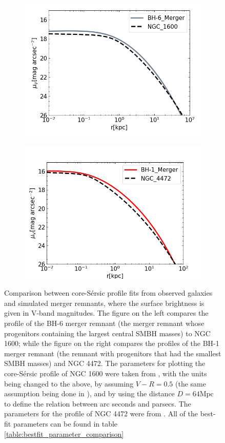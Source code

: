 \documentclass[english, oneside]{HYgradu}
\begin{document}
\begin{figure}
	\centering
	\begin{subfigure}[b]{0.49\textwidth}
		\includegraphics[width=\textwidth]{BH-6_NGC1600.png}
	\end{subfigure}
	\begin{subfigure}[b]{0.49\textwidth}
		\includegraphics[width=\textwidth]{BH-1_NGC4472.png}
	\end{subfigure}
	\caption{Comparison between core-Sérsic profile fits from observed galaxies and simulated merger remnants, where the surface brightness is given in V-band magnitudes. The figure on the left compares the profile of the BH-6 merger remnant (the merger remnant whose progenitors containing the largest central SMBH masses) to NGC 1600; while the figure on the right compares the profiles of the BH-1 merger remnant (the remnant with progenitors that had the smallest SMBH masses) and NGC 4472. The parameters for plotting the core-Sérsic profile of NGC 1600 were taken from \cite{Thomas2016}, with the units being changed to the above, by assuming $V - R = 0.5$ (the same assumption being done in \cite{Lauer2007}), and by using the distance $D = 64 \mathrm{Mpc}$ \citep{Thomas2016} to define the relation between arc seconds and parsecs. The parameters for the profile of NGC 4472 were from \cite{Rusli2013}. All of the best-fit parameters can be found in table \ref{table:bestfit_parameter_comparison}}

\end{figure}
\end{document}
